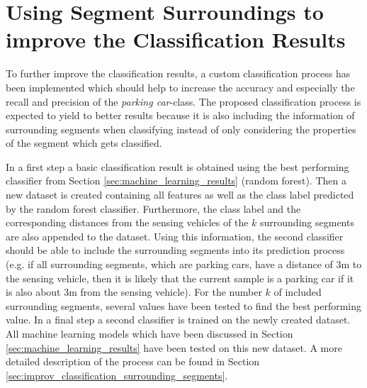 \section{Using Segment Surroundings to improve the Classification Results}
\label{sec:using_surroundings_to_improve_results}

To further improve the classification results, a custom classification process has been implemented which should help to increase the accuracy and especially the recall and precision of the \emph{parking car}-class. The proposed classification process is expected to yield to better results because it is also including the information of surrounding segments when classifying instead of only considering the properties of the segment which gets classified.

In a first step a basic classification result is obtained using the best performing classifier from Section \ref{sec:machine_learning_results} (random forest). 
Then a new dataset is created containing all features as well as the class label predicted by the random forest classifier. Furthermore, the class label and the corresponding distances from the sensing vehicles of the $k$ surrounding segments are also appended to the dataset. Using this information, the second classifier should be able to include the surrounding segments into its prediction process (e.g. if all surrounding segments, which are parking cars, have a distance of 3m to the sensing vehicle, then it is likely that the current sample is a parking car if it is also about 3m from the sensing vehicle). For the number $k$ of included surrounding segments, several values have been tested to find the best performing value. In a final step a second classifier is trained on the newly created dataset. All machine learning models which have been discussed in Section \ref{sec:machine_learning_results} have been tested on this new dataset. A more detailed description of the process can be found in Section \ref{sec:improv_classification_surrounding_segments}.

